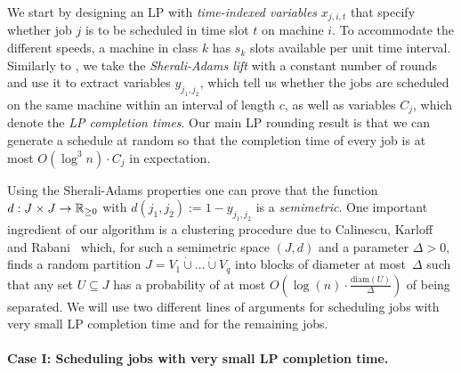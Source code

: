   We start by designing an LP with \emph{time-indexed variables} $x_{j,i,t}$ that specify whether job $j$ is to be scheduled in time slot $t$ on machine $i$. To accommodate the different speeds, a machine in class $k$ has $s_k$ slots available per unit time interval. Similarly to \cite{DKRTZ20}, we take the \emph{Sherali-Adams lift} with a constant number of rounds and use it to extract variables $y_{j_1,j_2}$, which tell us whether the jobs are scheduled on the same machine within an interval of length $c$, as well as variables $C_j$, which denote the \emph{LP completion times}. Our main LP rounding result is that we can generate a schedule at random so that the completion time of every job is at most $O(\log^3 n) \cdot C_j$ in expectation.
  
  Using the Sherali-Adams properties one can prove that the function $d : J \times J \to \mathbb{R}_{\geq 0}$ with $d(j_1,j_2) := 1- y_{j_1,j_2}$ is a \emph{semimetric}. One important ingredient of our algorithm is a clustering procedure due to Calinescu, Karloff and Rabani~\cite{DBLP:journals/siamcomp/CalinescuKR04} which, for such a semimetric space $(J,d)$ and a parameter $\Delta>0$, finds a random partition $J = V_1 \dot{\cup} \ldots \dot{\cup} V_q$ into blocks of diameter at most~$\Delta$ such that any set $U \subseteq J$ has a probability of at most $O(\log(n) \cdot \frac{\textrm{diam}(U)}{\Delta})$ of being separated. We will use two different lines of arguments for scheduling jobs with very small LP completion time and for the remaining jobs. 
  
  
  
  \paragraph{Case I: Scheduling jobs with very small LP completion time.}
  
